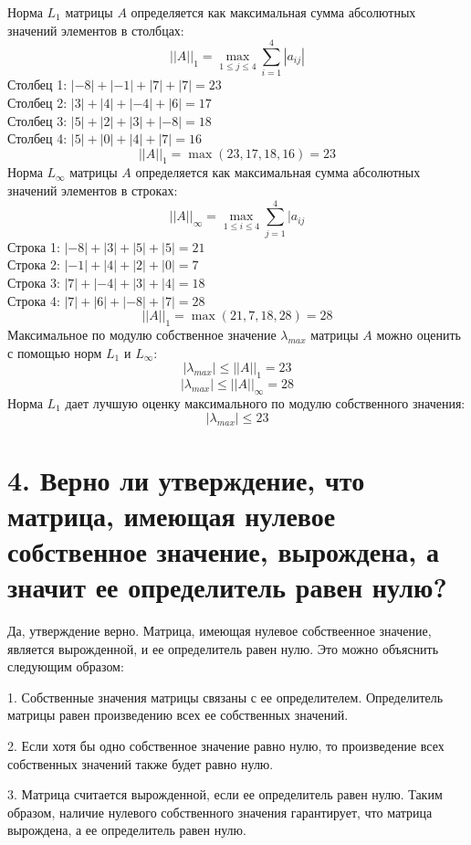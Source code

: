 \documentclass[a4paper,14pt]{article}
\begin{document}
Норма $L_{1}$ матрицы $A$ определяется как максимальная сумма абсолютных значений элементов в столбцах:
$$
||A||_{1} = \max\limits_{1 \leq j \leq 4} \sum_{i=1}^4|a_{ij}|
$$
Столбец 1: $|-8|+|-1|+|7|+|7|=23$\\
Столбец 2: $|3|+|4|+|-4|+|6|=17$\\
Столбец 3: $|5|+|2|+|3|+|-8|=18$\\
Столбец 4: $|5|+|0|+|4|+|7|=16$\\
$$||A||_{1}=\max(23, 17, 18, 16)=23$$
Норма $L_{\infty}$ матрицы $A$ определяется как максимальная сумма абсолютных значений элементов в строках:
$$
||A||_{\infty} = \max\limits_{1 \leq i \leq 4} \sum_{j=1}^4|a_{ij}
$$
Строка 1: $|-8|+|3|+|5|+|5|=21$\\
Строка 2: $|-1|+|4|+|2|+|0|=7$\\
Строка 3: $|7|+|-4|+|3|+|4|=18$\\
Строка 4: $|7|+|6|+|-8|+|7|=28$\\
$$||A||_{1}=\max(21, 7, 18, 28)=28$$
Максимальное по модулю собственное значение $\lambda_{max}$ матрицы $A$ можно оценить с помощью норм $L_{1}$ и $L_{\infty}$:
$$
|\lambda_{max}|\leq||A||_{1}=23
$$
$$
|\lambda_{max}|\leq||A||_{\infty}=28
$$
Норма $L_{1}$ дает лучшую оценку максимального по модулю собственного значения:
$$
|\lambda_{max}|\leq23
$$

\section{4. Верно ли утверждение, что матрица, имеющая нулевое собственное значение, вырождена, а значит ее определитель равен нулю?}

Да, утверждение верно. Матрица, имеющая нулевое собствеенное значение, является вырожденной, и ее определитель равен нулю.
Это можно объяснить следующим образом:

1. Собственные значения матрицы связаны с ее определителем. Определитель матрицы равен произведению всех ее собственных значений.

2. Если хотя бы одно собственное значение равно нулю, то произведение всех собственных значений также будет равно нулю.

3. Матрица считается вырожденной, если ее определитель равен нулю.
Таким образом, наличие нулевого собственного значения гарантирует, что матрица вырождена, а ее определитель равен нулю.
\end{document}
